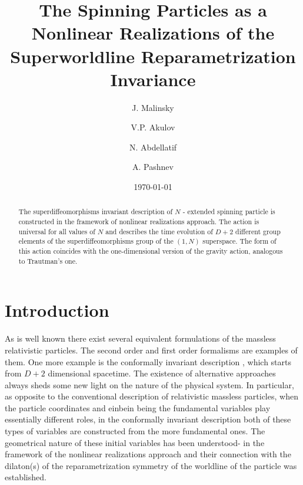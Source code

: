 \documentclass[a4paper,twocolumn,showpacs,preprintnumbers,amsmath,amssymb]{revtex4}
\begin{document}

\title{The Spinning Particles as a Nonlinear Realizations of the
Superworldline Reparametrization Invariance}%

\author{J. Malinsky}%
 \author{V.P. Akulov}%
\author{N. Abdellatif}
%

\author{A. Pashnev}
%

\date{\today}

\begin{abstract}
The superdiffeomorphisms invariant description
of $N$ - extended spinning particle is constructed in the framework of
nonlinear realizations approach. The action is universal
for all values of $N$ and describes the time evolution of $D+2$ different
group elements of the superdiffeomorphisms group of the $(1,N)$ superspace.
The form of this action
coincides  with the one-dimensional
version of the gravity action,  analogous to Trautman's one.
\end{abstract}


\maketitle

\section{Introduction}
As is well known there exist several equivalent formulations of the
massless relativistic particles. The second order and first order
formalisms are examples of them.
One more example is the
conformally invariant description \cite{M}, which starts from
$D+2$ dimensional spacetime.
The existence of alternative approaches always sheds some new light
on the nature of the physical system. In particular,
as opposite to the conventional description of relativistic massless
particles, when the particle coordinates and einbein being the fundamental
variables play
essentially different roles, in the conformally invariant description
both of these types of variables are constructed from the more
fundamental
ones\cite{M,S}. The geometrical nature of these
initial variables
has been understood\cite{P1}-\cite{P2} in the framework of
the nonlinear realizations approach and their connection  with the
dilaton(s) of the reparametrization symmetry of the worldline of the particle
was established.
\end{document}
